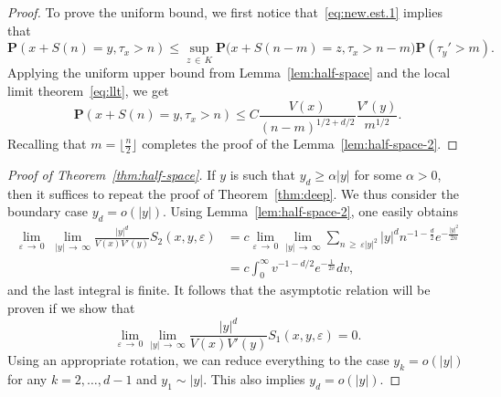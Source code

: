 \documentclass[10pt]{amsart}
\theoremstyle{definition}\newtheorem{defi}[theo]{Definition}\newtheorem{rema}[theo]{Remark}\newtheorem{exam}[theo]{Example}\newtheorem{exem}[theo]{Example}\newtheorem{nota}[theo]{Notation}
\newcommand{\pr}{\mathbf{P}}
\renewcommand{\epsilon}{\varepsilon}
\renewcommand{\le}{\leqslant}
\renewcommand{\ge}{\geqslant}
\begin{document}
\begin{proof}
To prove the uniform bound, we first notice that~\eqref{eq:new.est.1} implies that
\[
\pr\left(x+S(n)=y,\tau_x>n\right)
\le \sup_{z\,\in\,K}\pr\big(x+S(n-m)=z,\tau_x>n-m\big)
\pr\left(\tau_y'>m\right).
\]
Applying the uniform upper bound from Lemma~\ref{lem:half-space} and the local limit theorem~\eqref{eq:llt}, we get
\[
\pr\left(x+S(n)=y,\tau_x>n\right)
\le C\frac{V(x)}{(n-m)^{1/2+d/2}}\frac{V'(y)}{m^{1/2}}.
\]
Recalling that $m = \lfloor\tfrac{n}{2}\rfloor$ completes the proof of the Lemma~\ref{lem:half-space-2}.
\end{proof}



\begin{proof}[Proof of Theorem~\ref{thm:half-space}]
If $y$ is such that $y_d\ge\alpha | y|$ for some $\alpha>0$, then it suffices to repeat the proof of Theorem~\ref{thm:deep}. We thus consider the boundary case $y_d=o(| y|)$. Using Lemma~\ref{lem:half-space-2}, one easily obtains
\begin{align*}
\lim_{\varepsilon\,\to\,0}\;\lim_{|y|\,\to\,\infty}\frac{|y|^d}{V(x)V'(y)}S_2(x,y,\varepsilon) &= c\lim_{\varepsilon\,\to\,0}\lim_{|y|\,\to\,\infty}\sum_{n\,\ge\,\epsilon|y|^2}|y|^dn^{-1-\frac{d}{2}}e^{-\frac{|y|^2}{2n}}
\\
&= c\int_0^{\infty}v^{-1-{d}/{2}}e^{-\frac{1}{2v}}dv,
\end{align*}
and the last integral is finite. It follows that the asymptotic relation will be proven if we show that
\begin{equation}\label{half-space.1}
\lim_{\varepsilon\,\to\,0}\lim_{|y|\,\to\,\infty}\frac{|y|^d}{V(x)V'(y)}S_1(x,y,\varepsilon)=0.
\end{equation}
Using an appropriate rotation, we can reduce everything to the case $y_k=o(|y|)$ for any $k=2,\ldots,d-1$ and $y_1\sim |y|$. This also implies $y_d = o(|y|)$.


\end{proof}
\end{document}
